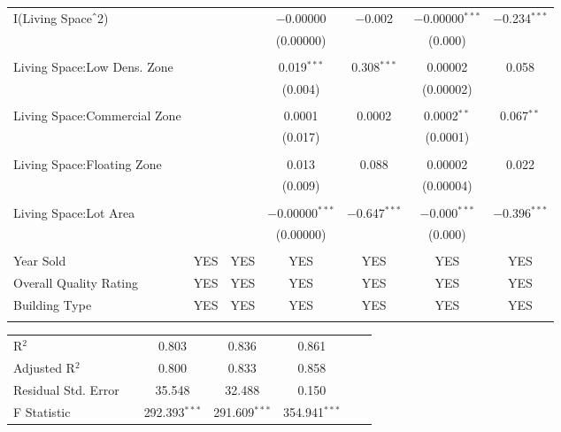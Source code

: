 \documentclass[a4paper]{article}
\begin{document}
\begin{table}[!htbp]
\begin{adjustwidth}{0.cm}{-0cm}
\begin{threeparttable}
\begin{tabular}{@{\extracolsep{-2pt}}lcccccc}
 I(Living Space$\hat{\mkern6mu}$2) &  &  & $-$0.00000 & $-$0.002 & $-$0.00000$^{***}$ & $-$0.234$^{***}$ \\ 
  &  &  & (0.00000) &  & (0.000) &  \\ 
  & & & & & & \\ 
 Living Space:Low Dens. Zone &  &  & 0.019$^{***}$ & 0.308$^{***}$ & 0.00002 & 0.058 \\ 
  &  &  & (0.004) & & (0.00002) &  \\ 
  & & & & & & \\ 
 Living Space:Commercial Zone &  &  & 0.0001 & 0.0002 & 0.0002$^{**}$ & 0.067$^{**}$ \\ 
  &  &  & (0.017) & & (0.0001) & \\ 
  & & & & & & \\ 
 Living Space:Floating Zone &  &  & 0.013 & 0.088 & 0.00002 & 0.022 \\ 
  &  &  & (0.009) &  & (0.00004) & \\ 
  & & & & & & \\ 
 Living Space:Lot Area &  &  & $-$0.00000$^{***}$ & $-$0.647$^{***}$ & $-$0.000$^{***}$ & $-$0.396$^{***}$ \\ 
  &  &  & (0.00000) &  & (0.000) &  \\ 
  & & & & & & \\ 
  Year Sold & YES & YES & YES & YES & YES & YES \\ 
  Overall Quality Rating & YES & YES & YES & YES & YES & YES \\  
  Building Type & YES & YES & YES & YES & YES & YES \\ 
\hline \\[-1.8ex]  
\end{tabular} 
\small 
\centering
\begin{tabular}{@{\extracolsep{39pt}}lcccccc} 
R$^{2}$ && 0.803 &   0.836 &  0.861   \\ 
Adjusted R$^{2}$ && 0.800 &  0.833 &   0.858  \\ 
Residual Std. Error && 35.548  & 32.488  & 0.150   \\ 
F Statistic& & 292.393$^{***}$    & 291.609$^{***}$   & 354.941$^{***}$    \\ 

\end{tabular}
\end{threeparttable}
\end{adjustwidth}
\end{table}
\end{document}
